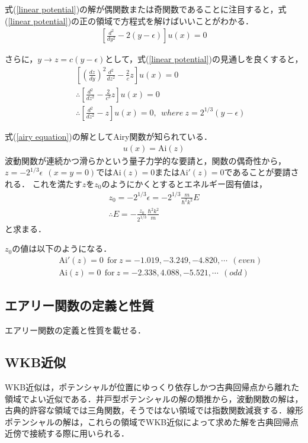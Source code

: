 \documentclass[12pt]{jsarticle}
\numberwithin{equation}{section}
\begin{document}
式(\ref{linear potential})の解が偶関数または奇関数であることに注目すると，式(\ref{linear potential})の正の領域で方程式を解けばいいことがわかる．
\begin{eqnarray}\label{linear potential 2}
	\left[\frac{d^2}{dy^2} - 2(y - \epsilon)\right]u(x) = 0
\end{eqnarray}

さらに，$y\to z=c(y-\epsilon)$として，式(\ref{linear potential})の見通しを良くすると，
\begin{eqnarray}\label{airy equation}
	&& \left[\left(\frac{dz}{dy}\right)^2 \frac{d^2}{dz^2} - \frac{2}{c} z\right]u(x) = 0\nonumber\\
	&& \therefore \left[\frac{d^2}{dz^2} - \frac{2}{c^3} z\right]u(x) = 0 \nonumber\\
	&& \therefore \left[\frac{d^2}{dz^2} - z\right]u(x) = 0 , ~~ where ~ z=2^{1/3}(y-\epsilon)
\end{eqnarray}

式(\ref{airy equation})の解としてAiry関数が知られている．
\begin{eqnarray}
	u(x) = \mathrm{Ai}(z)
\end{eqnarray}
波動関数が連続かつ滑らかという量子力学的な要請と，関数の偶奇性から，$z=-2^{1/3}\epsilon ~~ (x=y=0)$では$\mathrm{Ai}(z)=0$または$\mathrm{Ai}'(z)=0$であることが要請される．
これを満たす$z$を$z_0$のようにかくとするとエネルギー固有値は，
\begin{eqnarray}
	z_0 = -2^{1/3}\epsilon = - 2^{1/3}\frac{m}{\hbar^2 k^2} E\nonumber\\
	\therefore E = -\frac{z_0}{2^{1/3}}\frac{\hbar^2 k^2}{m}
\end{eqnarray}
と求まる．

$z_0$の値は以下のようになる．
\begin{eqnarray}
	&& \mathrm{Ai}'(z)=0 ~~ \mathrm{for} ~ z=-1.019, -3.249, -4.820, \cdots  ~~ (even)\nonumber\\
	&& \mathrm{Ai}(z)=0 ~~ \mathrm{for}  ~ z=-2.338, 4.088,-5.521, \cdots ~~ (odd)\nonumber
\end{eqnarray}

\subsection{エアリー関数の定義と性質}
エアリー関数の定義と性質を載せる．

\subsection{WKB近似}
WKB近似は，ポテンシャルが位置にゆっくり依存しかつ古典回帰点から離れた領域でよい近似である．井戸型ポテンシャルの解の類推から，波動関数の解は，古典的許容な領域では三角関数，そうではない領域では指数関数減衰する．線形ポテンシャルの解は，これらの領域でWKB近似によって求めた解を古典回帰点近傍で接続する際に用いられる．
\end{document}
